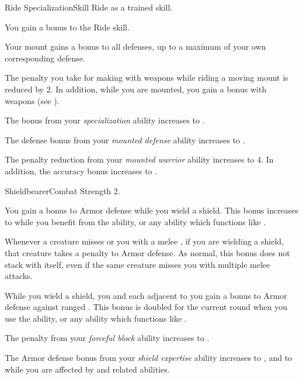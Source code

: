   \begin{feat}{Ride Specialization}{Skill}
    \featpre Ride as a trained skill.

     You gain a  bonus to the Ride skill.

     Your mount gains a  bonus to all defenses, up to a maximum of your own corresponding defense.

     The penalty you take for making  with  weapons while riding a moving mount is reduced by 2.
    In addition, while you are mounted, you gain a   bonus with  weapons (see ).

     The bonus from your \textit{specialization} ability increases to .

     The defense bonus from your \textit{mounted defense} ability increases to .

     The penalty reduction from your \textit{mounted warrior} ability increases to 4.
    In addition, the accuracy bonus increases to .
  \end{feat}

  \begin{feat}{Shieldbearer}{Combat}
    \featpre Strength 2.

     You gain a  bonus to Armor defense while you wield a shield.
    This bonus increases to  while you benefit from the  ability, or any ability which functions like .

     Whenever a creature misses or  you with a melee , if you are wielding a shield, that creature  takes a  penalty to Armor defense.
    As normal, this bonus does not stack with itself, even if the same creature misses you with multiple melee attacks.

     While you wield a shield, you and each  adjacent to you gain a  bonus to Armor defense against ranged .
    This bonus is doubled for the current round when you use the  ability, or any ability which functions like .

     The penalty from your \textit{forceful block} ability increases to .

     The Armor defense bonus from your \textit{shield expertise} ability increases to , and to  while you are affected by  and related abilities.
  \end{feat}

